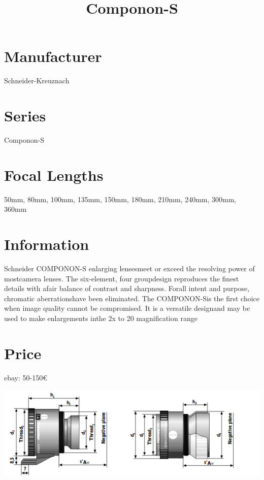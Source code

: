 \documentclass{article}
\begin{document}
\usepackage{titlesec}
\usepackage{graphicx}


\title{Componon-S}
\section{Manufacturer}
Schneider-Kreuznach
\section{Series}
Componon-S 
\section{Focal Lengths}
50mm, 80mm, 100mm, 135mm, 150mm, 180mm, 210mm, 240mm, 300mm, 360mm
\section{Information}
Schneider COMPONON-S enlarging lensesmeet or exceed the resolving power of mostcamera lenses.  The six-element, four groupdesign reproduces the finest details with afair balance of contrast and sharpness. Forall intent and purpose, chromatic aberrationshave been eliminated. The COMPONON-Sis the first choice when image quality cannot be compromised. It is a versatile designand may be used to make enlargements inthe 2x to 20 magnification range

\section{Price}
ebay: 50-150€


\includegraphics[width=\textwidth]{componon-s.png}
\end{document}
